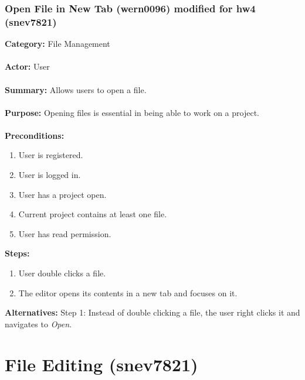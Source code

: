 \documentclass[11pt]{report}
\begin{document}
\newpage

\subsubsection{Open File in New Tab (wern0096) modified for hw4 (snev7821)}
\begin{framed}

	\textbf{Category:} File Management \\ \\
	\textbf{Actor:} User \\ \\
	\textbf{Summary:} Allows users to open a file. \\ \\
	\textbf{Purpose:} Opening files is essential in being able to work on a project. \\ \\
	\textbf{Preconditions:} 
	\begin{enumerate}
		\item User is registered.
		\item User is logged in.
		\item User has a project open.
		\item Current project contains at least one file.
		\item User has read permission.
	\end{enumerate}		
	\textbf{Steps:}
	\begin{enumerate}
		\item User double clicks a file.
		\item The editor opens its contents in a new tab and focuses on it.
	\end{enumerate}	
	\textbf{Alternatives:} Step 1: Instead of double clicking a file, the user right clicks it and navigates to \textit{Open}.
\end{framed}
\newpage




\section{File Editing (snev7821)}
\end{document}
